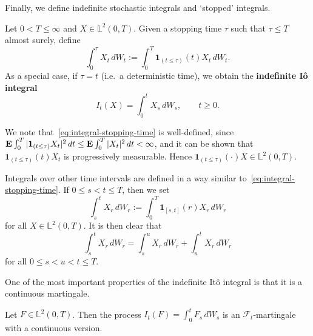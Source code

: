 Finally, we define indefinite stochastic integrals and `stopped' integrals.
\begin{definition}
    Let $0<T\le\infty$ and $X\in\mathbb{L}^2(0,T)$. Given a stopping time $\tau$ such that $\tau\le T$ almost surely, define
    \begin{equation}
    \label{eq:integral-stopping-time}
        \int_0^\tau X_t \,dW_t := \int_0^T \mathbf{1}_{(t\le\tau)}(t) X_t\,dW_t.
    \end{equation}
    As a special case, if $\tau=t$ (i.e.\ a deterministic time), we obtain the \textbf{indefinite I\^{o} integral}
    \begin{equation*}
        I_t(X) = \int_0^t X_s\,dW_s, \qquad t\ge 0.
    \end{equation*}
\end{definition}
We note that~\eqref{eq:integral-stopping-time} is well-defined, since $\mathbf{E}\int_0^T |\mathbf{1}_{(t\le\tau)}X_t|^2\,dt \le \mathbf{E}\int_0^T |X_t|^2\,dt<\infty$, and it can be shown that $\mathbf{1}_{(t\le\tau)}(t)X_t$ is progressively measurable. Hence $\mathbf{1}_{(t\le\tau)}(\cdot)X\in\mathbb{L}^2(0,T)$.

Integrals over other time intervals are defined in a way similar to~\eqref{eq:integral-stopping-time}. If $0\le s<t\le T$, then we set
\begin{equation*}
    \int_s^t X_r\,dW_r := \int_0^T \mathbf{1}_{[s,t]}(r)X_r\,dW_r
\end{equation*}
for all $X\in\mathbb{L}^2(0,T)$. It is then clear that
\begin{equation*}
    \int_s^t X_r\,dW_r = \int_s^u X_r\,dW_r + \int_u^t X_r\,dW_r
\end{equation*}
for all $0\le s<u<t\le T$.

One of the most important properties of the indefinite It\^{o} integral is that it is a continuous martingale.
\begin{theorem}
\label{thm:ito-integral-mart}
    Let $F\in\mathbb{L}^2(0,T)$. Then the process $I_t(F) = \int_0^t F_s \,dW_s$ is an $\mathcal{F}_t$-martingale with a continuous version.
\end{theorem}

